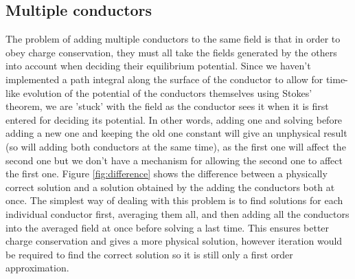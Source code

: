 \documentclass[aps,twocolumn,pre,nofootinbib,10pt]{revtex4-1}
\begin{document}
\subsection{Multiple conductors}
The problem of adding multiple conductors to the same field is that in order to obey charge conservation, they must all take the fields generated by the others into account when deciding their equilibrium potential. Since we haven't implemented a path integral along the surface of the conductor to allow for time-like evolution of the potential of the conductors themselves using Stokes' theorem, we are 'stuck' with the field as the conductor sees it when it is first entered for deciding its potential. In other words, adding one and solving before adding a new one and keeping the old one constant will give an unphysical result (so will adding both conductors at the same time), as the first one will affect the second one but we don't have a mechanism for allowing the second one to affect the first one. Figure \ref{fig:difference} shows the difference between a physically correct solution and a solution obtained by the adding the conductors both at once. The simplest way of dealing with this problem is 
to find solutions for each individual conductor 
first, averaging them all, and then adding all the conductors into the averaged field at once before solving a last time. This ensures better charge conservation and gives a more physical solution, however iteration would be required to find the correct solution so it is still only a first order approximation.
\end{document}
